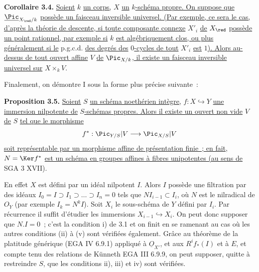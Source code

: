 
\textbf{Corollaire 3.4.} \uline{Soient} \(k\) \uline{un corps,} \(X\) \uline{un} \(k\)\uline{-schéma propre. On suppose que} \(\underline{\Pic}_{X_{\red}/k}\) \uline{possède un faisceau inversible universel. (Par exemple, ce sera le cas, d'après la théorie de descente, si toute composante connexe} \(X'_i\) \uline{de} \(X_{\red}\) \uline{possède un point rationnel, par exemple si} \(k\) \uline{est algébriquement clos, ou plus généralement si le} p.g.c.d. \uline{des degrés des} \(0\)\uline{-cycles de tout} \(X'_i\) \uline{est} \(1\)\uline{). Alors au-dessus de tout ouvert affine} \(V\) \uline{de} \(\Pic_{X/k}\)\uline{, il existe un faisceau inversible universel sur} \(X\times_kV\).

Finalement, on démontre I sous la forme plus précise suivante~:

\textbf{Proposition 3.5.} \uline{Soient} \(S\) \uline{un schéma noethérien intègre,} \(f:X\hookrightarrow Y\) \uline{une immersion nilpotente de} \(S\)\uline{-schémas propres. Alors il existe un ouvert non vide} \(V\) \uline{de} \(S\) \uline{tel que le morphisme}
\[
  f^*:\Pic_{Y/S}|V\longrightarrow\Pic_{X/S}|V
\]
\uline{soit représentable par un morphisme affine de présentation finie~; en fait,} \(N=\Ker f^*\) \uline{est un schéma en groupes affines à fibres unipotentes (au sens de} SGA 3 XVII).

En effet \(X\) est défini par un idéal nilpotent \(I\). Alors \(I\) possède une filtration par des idéaux \(I_0=I\supset I_1\supset\ldots\supset I_n=0\) tels que \(NI_{i-1}\subset I_i\), où \(N\) est le nilradical de \({O}_Y\) (par exemple \(I_k=N^kI\)). Soit \(X_i\) le sous-schéma de \(Y\) défini par \(I_i\). Par récurrence il suffit d'étudier les immersions \(X_{i-1}\hookrightarrow X_i\). On peut donc supposer que \(N.I=0\)~; c'est la condition i) de 3.1 et on finit en se ramenant au cas où les autres conditions (ii) à (v) sont vérifiées également. Grâce au théorème de la platitude générique (EGA IV 6.9.1) appliqué à \(\underline{O}_{X'}\), et aux \(R^if_*(I)\) et à \(E\), et compte tenu des relations de Künneth EGA III 6.9.9, on peut supposer, quitte à restreindre \(S\), que les conditions ii), iii) et iv) sont vérifiées.

